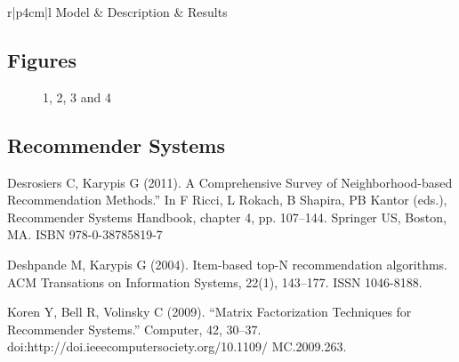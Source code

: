\centering	
\begin{table}[H]\tiny
	\caption{}	
	\begin{tabular}{r|p{4cm}|l}
		\hline	
		Model & Description & Results \\
		\hline 
		\hline 
	\end{tabular}
\end{table}

\subsection{Figures}

\begin{figure}[H]
	\centering
	\begin{minipage}[b]{0.5\linewidth}
	\end{minipage}\hfill
	\begin{minipage}[b]{0.5\linewidth}
	\end{minipage}\hfill	
	\begin{minipage}[b]{0.5\linewidth}
	\end{minipage}\hfill
	\begin{minipage}[b]{0.5\linewidth}
	\end{minipage}\hfill
	\caption{1, 2, 3 and 4}
	\label{fig:Figure1}
\end{figure} 



\begin{thebibliography}{00}

\subsection{Recommender Systems}

Desrosiers C, Karypis G (2011). 
\newblock A Comprehensive Survey of Neighborhood-based Recommendation Methods.” In F Ricci, L Rokach, B Shapira, PB Kantor (eds.), 
\newblock Recommender Systems Handbook, chapter 4, pp. 107–144. Springer US, Boston, MA. ISBN 978-0-38785819-7

Deshpande M, Karypis G (2004). 
\newblock Item-based top-N recommendation algorithms.
\newblock ACM Transations on Information Systems, 22(1), 143–177. ISSN 1046-8188.

Koren Y, Bell R, Volinsky C (2009). 
\newblock “Matrix Factorization Techniques for Recommender Systems.” 
\newblock Computer, 42, 30–37. doi:http://doi.ieeecomputersociety.org/10.1109/ MC.2009.263.


\end{thebibliography}



